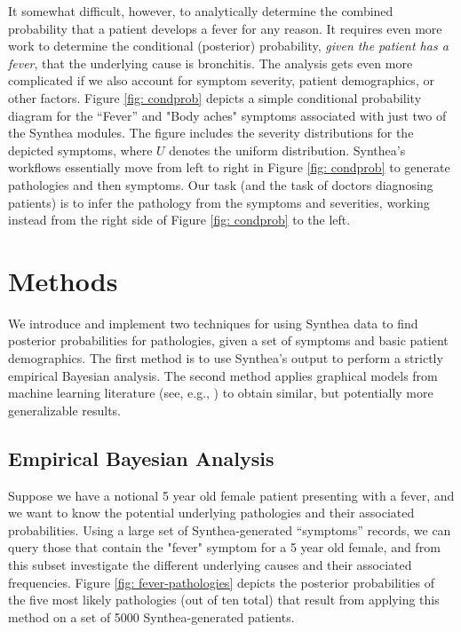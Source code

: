 \documentclass[11pt]{article}
\begin{document}
It somewhat difficult, however, to analytically determine the combined probability that a patient develops a fever for any reason.  It requires even more work to determine the conditional (posterior) probability, \emph{given the patient has a fever}, that the underlying cause is bronchitis.  The analysis gets even more complicated if we also account for symptom severity, patient demographics, or other factors.  Figure \ref{fig: condprob} depicts a simple conditional probability diagram for the ``Fever'' and "Body aches" symptoms associated with just two of the Synthea modules.  The figure includes the severity distributions for the depicted symptoms, where $U$ denotes the uniform distribution.  Synthea's workflows essentially move from left to right in Figure \ref{fig: condprob} to generate pathologies and then symptoms.  Our task (and the task of doctors diagnosing patients) is to infer the pathology from the symptoms and severities, working instead from the right side of Figure \ref{fig: condprob} to the left.


\section{Methods}

We introduce and implement two techniques for using Synthea data to find posterior probabilities for pathologies, given a set of symptoms and basic patient demographics.  The first method is to use Synthea's output to perform a strictly empirical Bayesian analysis.  The second method applies graphical models from machine learning literature (see, e.g., \cite[pp 359--383]{bishop2013pattern}) to obtain similar, but potentially more generalizable results.

\subsection{Empirical Bayesian Analysis} \label{section: empirical-analysis}

Suppose we have a notional 5 year old female patient presenting with a fever, and we want to know the potential underlying pathologies and their associated probabilities.  Using a large set of Synthea-generated ``symptoms'' records, we can query those that contain the "fever" symptom for a 5 year old female, and from this subset investigate the different underlying causes and their associated frequencies. Figure \ref{fig: fever-pathologies} depicts the posterior probabilities of the five most likely pathologies (out of ten total) that result from applying this method on a set of 5000 Synthea-generated patients.
\end{document}
